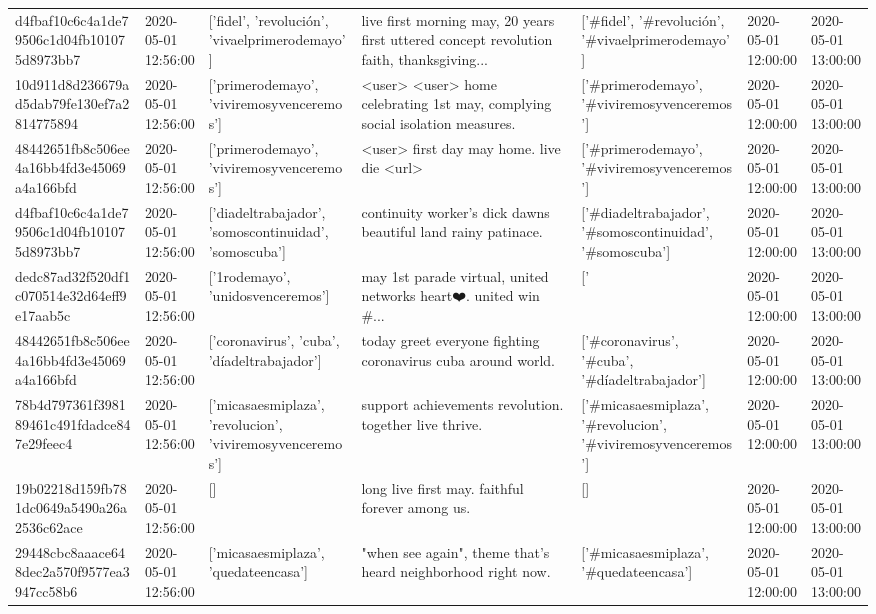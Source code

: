 \begin{tabular}{lllllll}
d4fbaf10c6c4a1de79506c1d04fb101075d8973bb7 & 2020-05-01 12:56:00 & ['fidel', 'revolución', 'vivaelprimerodemayo'] & live first morning may, 20 years first uttered concept revolution faith, thanksgiving... & ['#fidel', '#revolución', '#vivaelprimerodemayo'] & 2020-05-01 12:00:00 & 2020-05-01 13:00:00 \\
10d911d8d236679ad5dab79fe130ef7a2814775894 & 2020-05-01 12:56:00 & ['primerodemayo', 'viviremosyvenceremos'] & <user> <user> home celebrating 1st may, complying social isolation measures. & ['#primerodemayo', '#viviremosyvenceremos'] & 2020-05-01 12:00:00 & 2020-05-01 13:00:00 \\
48442651fb8c506ee4a16bb4fd3e45069a4a166bfd & 2020-05-01 12:56:00 & ['primerodemayo', 'viviremosyvenceremos'] & <user> first day may home. live die <url> & ['#primerodemayo', '#viviremosyvenceremos'] & 2020-05-01 12:00:00 & 2020-05-01 13:00:00 \\
d4fbaf10c6c4a1de79506c1d04fb101075d8973bb7 & 2020-05-01 12:56:00 & ['diadeltrabajador', 'somoscontinuidad', 'somoscuba'] & continuity worker's dick dawns beautiful land rainy patinace. & ['#diadeltrabajador', '#somoscontinuidad', '#somoscuba'] & 2020-05-01 12:00:00 & 2020-05-01 13:00:00 \\
dedc87ad32f520df1c070514e32d64eff9e17aab5c & 2020-05-01 12:56:00 & ['1rodemayo', 'unidosvenceremos'] & may 1st parade virtual, united networks heart❤️. united win \#... & ['#1rodemayo', '#unidosvenceremos'] & 2020-05-01 12:00:00 & 2020-05-01 13:00:00 \\
48442651fb8c506ee4a16bb4fd3e45069a4a166bfd & 2020-05-01 12:56:00 & ['coronavirus', 'cuba', 'díadeltrabajador'] & today greet everyone fighting coronavirus cuba around world. & ['#coronavirus', '#cuba', '#díadeltrabajador'] & 2020-05-01 12:00:00 & 2020-05-01 13:00:00 \\
78b4d797361f398189461c491fdadce847e29feec4 & 2020-05-01 12:56:00 & ['micasaesmiplaza', 'revolucion', 'viviremosyvenceremos'] & support achievements revolution. together live thrive. & ['#micasaesmiplaza', '#revolucion', '#viviremosyvenceremos'] & 2020-05-01 12:00:00 & 2020-05-01 13:00:00 \\
19b02218d159fb781dc0649a5490a26a2536c62ace & 2020-05-01 12:56:00 & [] & long live first may. faithful forever among us. & [] & 2020-05-01 12:00:00 & 2020-05-01 13:00:00 \\
29448cbc8aaace648dec2a570f9577ea3947cc58b6 & 2020-05-01 12:56:00 & ['micasaesmiplaza', 'quedateencasa'] & "when see again", theme that's heard neighborhood right now. & ['#micasaesmiplaza', '#quedateencasa'] & 2020-05-01 12:00:00 & 2020-05-01 13:00:00 \\

\end{tabular}
